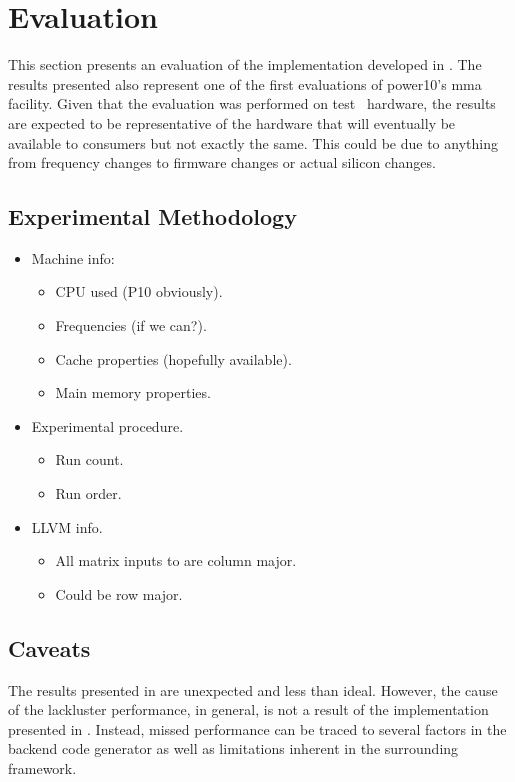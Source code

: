 \documentclass[\main/thesis.tex]{subfiles}
\begin{document}
\chapter{Evaluation}
\label{cha:evaluation}
This section presents an evaluation of the implementation developed in .
The results presented also represent one of the first evaluations of \gls{power10}'s \gls{mma} facility.
Given that the evaluation was performed on test~ hardware, the results are expected to be representative of the hardware that will eventually be available to consumers but not exactly the same.
This could be due to anything from frequency changes to firmware changes or actual silicon changes.

\section{Experimental Methodology}
\begin{itemize}
  \item
    Machine info:
    \begin{itemize}
      \item CPU used (P10 obviously).
      \item Frequencies (if we can?).
      \item Cache properties (hopefully available).
      \item Main memory properties.
    \end{itemize}
  \item
    Experimental procedure.
    \begin{itemize}
      \item Run count.
      \item Run order.
    \end{itemize}
  \item
    LLVM info.
      \begin{itemize}
        \item All matrix inputs to  are column major.
        \item Could be row major.
      \end{itemize}
\end{itemize}

\section{Caveats}
The results presented in  are unexpected and less than ideal.
However, the cause of the lackluster performance, in general, is not a result of the implementation presented in .
Instead, missed performance can be traced to several factors in the backend code generator as well as limitations inherent in the surrounding framework.
\end{document}
